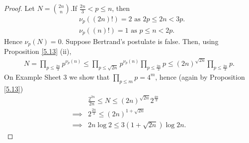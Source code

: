 \documentclass{article}
\theoremstyle{definition}
\begin{document}
\begin{proof}
    Let $N={{2n}\choose{n}}$.If $\frac{2n}{3}<p\le n$, then 
    \begin{align*}
        &\nu_p((2n)!) = 2 \text{ as } 2p\le 2n<3p. \\
        &\nu_p((n)!) = 1 \text{ as } p\le n<2p.
    \end{align*}
    Hence $\nu_p(N)=0$. Suppose Bertrand's postulate is false. Then, using Proposition \ref{5.13} (ii),
    \begin{align*}
        N = \prod_{p\le \frac{2n}{3}}^{} p^{\nu_p(n)} \le \prod_{p \le \sqrt{2n}}^{} p^{\nu_p(n)}\prod_{p\le \frac{2n}{3}}^{} p \le (2n)^{\sqrt{2n}} \prod_{p\le \frac{2n}{3}}^{} p.
    \end{align*}
    On Example Sheet 3 we show that $\prod_{p\le m}^{} p = 4^m$, hence (again by Proposition \ref{5.13})
    \begin{align*}
        &\frac{2^{2n}}{2n} \le N \le (2n)^{\sqrt{2n}} 2^{\frac{4n}{3}} \\
        \implies& 2^{\frac{2n}{3}} \le (2n)^{1+\sqrt{2n}} \\
        \implies& 2n \log 2 \le 3(1+\sqrt{2n})\log2n.
    \end{align*}
\end{proof}
\end{document}
